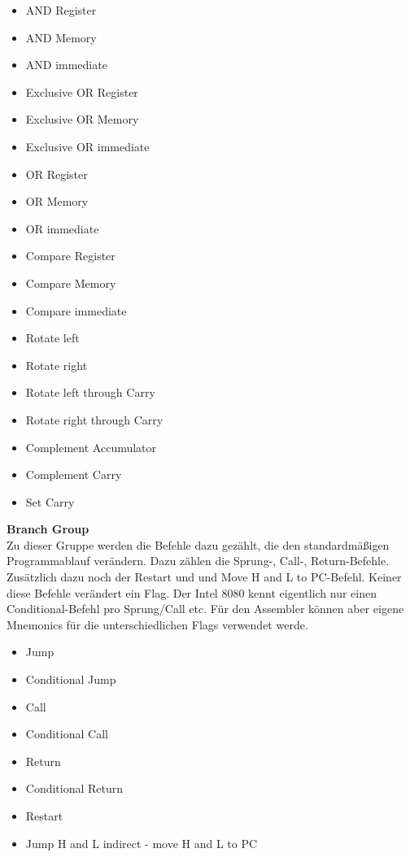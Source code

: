 \documentclass[12pt]{article}
\begin{document}
\begin{multicols}{2}
\begin{itemize}
\item AND Register
\item AND Memory
\item AND immediate
\item Exclusive OR Register
\item Exclusive OR Memory
\item Exclusive OR immediate
\item OR Register
\item OR Memory
\item OR immediate
\item Compare Register
\item Compare Memory
\item Compare immediate
\item Rotate left
\item Rotate right
\item Rotate left through Carry
\item Rotate right through Carry
\item Complement Accumulator
\item Complement Carry
\item Set Carry
\end{itemize}
\end{multicols}

\vspace{10pt}
\noindent
\textbf{Branch Group}\\
Zu dieser Gruppe werden die Befehle dazu gezählt, die den standardmäßigen Programmablauf verändern. Dazu zählen die Sprung-, Call-, Return-Befehle. Zusätzlich dazu noch der Restart und  und Move H and L to PC-Befehl. Keiner diese Befehle verändert ein Flag. Der Intel 8080 kennt eigentlich nur einen Conditional-Befehl pro Sprung/Call etc. Für den Assembler können aber eigene Mnemonics für die unterschiedlichen Flags verwendet werde. 

\begin{itemize}
\item Jump
\item Conditional Jump
\item Call
\item Conditional Call
\item Return
\item Conditional Return
\item Restart
\item Jump H and L indirect - move H and L to PC
\end{itemize}
\end{document}
